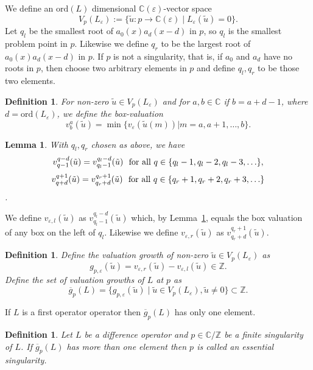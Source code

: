 \documentclass{article}
\newtheorem{lemma}[theorem]{Lemma}
\newtheorem{definition}[theorem]{Definition}
\newcommand{\Z}{{\mathbb{Z}}} \newcommand{\Q}{{\mathbb{Q}}}
\newcommand{\C}{{\mathbb{C}}} \newcommand{\N}{{\mathbb{N}}}
\newcommand{\ord}{\mathrm{ord}}
\begin{document}
We define an $\ord(L)$ dimensional $\C(\varepsilon)$-vector space 
$$V_p(L_\varepsilon):=\{\tilde{u}:p \rightarrow \C(\varepsilon) \mid L_\varepsilon(\tilde{u})=0\}.$$
Let $q_l$ be the smallest root of $a_0(x)a_d(x-d)$ in $p$, so
$q_l$ is the smallest problem point
in $p$. Likewise we define $q_r$ to be the largest root of $a_0(x)a_d(x-d)$ in $p$. If $p$ is not a singularity,
that is, if $a_0$ and $a_d$ have no roots in $p$,
then choose two arbitrary elements in $p$ and define $q_l, q_r$ to be those two elements.


\begin{definition} \label{box} For non-zero $\tilde{u} \in V_p(L_\varepsilon)$ and for $a,
  b \in \C$ if $b=a+d-1$, where $d=\ord(L_\varepsilon)$, we define the {\em box-valuation}
$$v^a_b(\tilde{u})=\min\{v_\varepsilon(\tilde{u}(m))|m=a,a+1,\ldots,b\}.$$ \end{definition}

\begin{lemma}
    \label{vl}
With $q_l, q_r$ chosen as above, we have
$$v_{q-1}^{q-d}(\tilde{u})=v_{q_l-1}^{q_l-d}(\tilde{u}) \ \ \text{\rm for all} \ q \in \{q_l-1,q_l-2,q_l-3,\ldots \},$$
$$v_{q+d}^{q+1}(\tilde{u})=v_{q_r+d}^{q_r+1}(\tilde{u}) \ \ \text{\rm for all} \ q \in \{q_r+1,q_r+2,q_r+3,\ldots \}$$. \end{lemma}


We define $v_{\varepsilon,l}(\tilde{u})$ as $v_{q_l-1}^{q_l-d}(\tilde{u})$ which, by Lemma~\ref{vl}, equals the box valuation of any box on the left of
$q_l$. Likewise we define $v_{\varepsilon,r}(\tilde{u})$ as $v_{q_r+d}^{q_r+1}(\tilde{u})$.

\begin{definition}
\label{def:valg}
 Define the {\em valuation growth} of non-zero $\tilde{u} \in V_p(L_\varepsilon)$ as
$$g_{p,\varepsilon}(\tilde{u})=v_{\varepsilon,r}(\tilde{u})-v_{\varepsilon,l}(\tilde{u}) \in \Z.$$
Define the {\em set of valuation growths} of $L$ at $p$ as
$$\overline{g}_p(L)=\{g_{p,\varepsilon}(\tilde{u}) \mid \tilde{u}\in V_p(L_\varepsilon),\tilde{u}\neq0\}\subset \Z.$$ \end{definition}
If $L$ is a first operator operator then $\overline{g}_p(L)$ has only one element. 



\begin{definition}
    \label{apartsing}
    Let $L$ be a difference operator and $p \in \C/\Z$ be a finite singularity of $L$. If
    $\overline{g}_p(L)$ has more than one element then $p$ is called an {\em essential
      singularity}. 
\end{definition}
\end{document}
